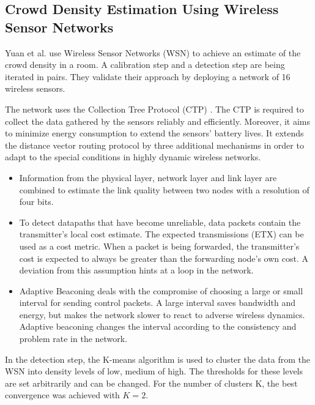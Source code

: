 \documentclass[conference]{IEEEtran}
\begin{document}
\subsection{Crowd Density Estimation Using Wireless Sensor Networks}
Yuan et al. \cite{Yuan} use Wireless Sensor Networks (WSN) to achieve an estimate of the crowd density in a room. A calibration step and a detection step are being iterated in pairs. They validate their approach by deploying a network of 16 wireless sensors. 
\par
The network uses the Collection Tree Protocol (CTP) \cite{ctp}. The CTP is required to collect the data gathered by the sensors reliably and efficiently. Moreover, it aims to minimize energy consumption to extend the sensors' battery lives. It extends the distance vector routing protocol by three additional mechanisms in order to adapt to the special conditions in highly dynamic wireless networks.
\begin{itemize}
\item Information from the physical layer, network layer and link layer are combined to estimate the link quality between two nodes with a resolution of four bits.
\item To detect datapaths that have become unreliable, data packets contain the transmitter's local cost estimate. The expected transmissions (ETX) can be used as a cost metric. When a packet is being forwarded, the transmitter's cost is expected to always be greater than the forwarding node's own cost. A deviation from this assumption hints at a loop in the network.
\item Adaptive Beaconing deals with the compromise of choosing a large or small interval for sending control packets. A large interval saves bandwidth and energy, but makes the network slower to react to adverse wireless dynamics. Adaptive beaconing changes the interval according to the consistency and problem rate in the network.
\end{itemize}
In the detection step, the K-means algorithm is used to cluster the data from the WSN into density levels of low, medium of high. The thresholds for these levels are set arbitrarily and can be changed. For the number of clusters K, the best convergence was achieved with $K=2$.
\end{document}

